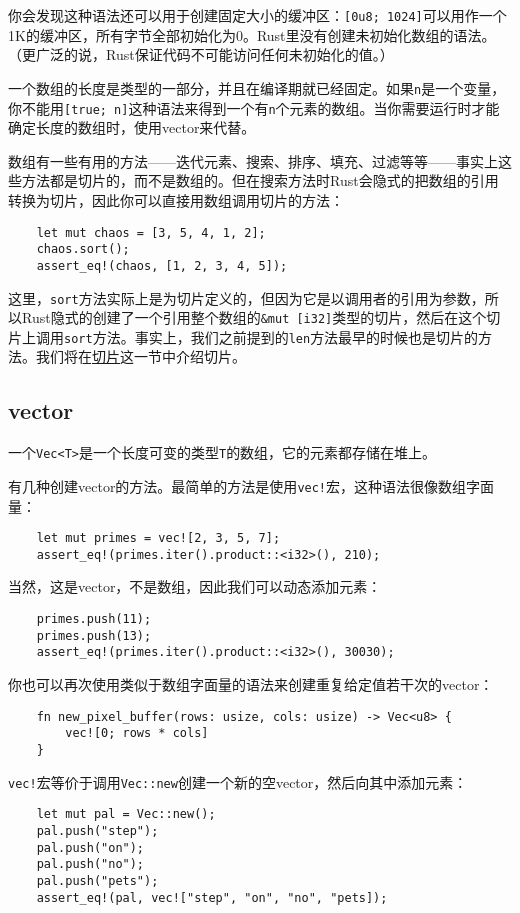 你会发现这种语法还可以用于创建固定大小的缓冲区：\texttt{[0u8; 1024]}可以用作一个1K的缓冲区，所有字节全部初始化为0。Rust里没有创建未初始化数组的语法。（更广泛的说，Rust保证代码不可能访问任何未初始化的值。）

一个数组的长度是类型的一部分，并且在编译期就已经固定。如果\texttt{n}是一个变量，你不能用\texttt{[true; n]}这种语法来得到一个有\texttt{n}个元素的数组。当你需要运行时才能确定长度的数组时，使用vector来代替。

数组有一些有用的方法——迭代元素、搜索、排序、填充、过滤等等——事实上这些方法都是切片的，而不是数组的。但在搜索方法时Rust会隐式的把数组的引用转换为切片，因此你可以直接用数组调用切片的方法：
\begin{verbatim}
    let mut chaos = [3, 5, 4, 1, 2];
    chaos.sort();
    assert_eq!(chaos, [1, 2, 3, 4, 5]);
\end{verbatim}

这里，\texttt{sort}方法实际上是为切片定义的，但因为它是以调用者的引用为参数，所以Rust隐式的创建了一个引用整个数组的\texttt{\&mut [i32]}类型的切片，然后在这个切片上调用\texttt{sort}方法。事实上，我们之前提到的\texttt{len}方法最早的时候也是切片的方法。我们将在\hyperref[slice]{切片}这一节中介绍切片。

\subsection{vector}\label{vector}

一个\texttt{Vec<T>}是一个长度可变的类型\texttt{T}的数组，它的元素都存储在堆上。

有几种创建vector的方法。最简单的方法是使用\texttt{vec!}宏，这种语法很像数组字面量：
\begin{verbatim}
    let mut primes = vec![2, 3, 5, 7];
    assert_eq!(primes.iter().product::<i32>(), 210);
\end{verbatim}
当然，这是vector，不是数组，因此我们可以动态添加元素：
\begin{verbatim}
    primes.push(11);
    primes.push(13);
    assert_eq!(primes.iter().product::<i32>(), 30030);
\end{verbatim}

你也可以再次使用类似于数组字面量的语法来创建重复给定值若干次的vector：
\begin{verbatim}
    fn new_pixel_buffer(rows: usize, cols: usize) -> Vec<u8> {
        vec![0; rows * cols]
    }
\end{verbatim}
\texttt{vec!}宏等价于调用\texttt{Vec::new}创建一个新的空vector，然后向其中添加元素：
\begin{verbatim}
    let mut pal = Vec::new();
    pal.push("step");
    pal.push("on");
    pal.push("no");
    pal.push("pets");
    assert_eq!(pal, vec!["step", "on", "no", "pets]);
\end{verbatim}

